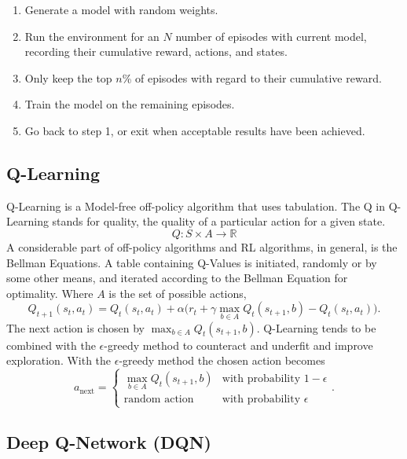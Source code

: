 \begin{enumerate}[label=Step \arabic*:, itemsep=0mm]
	\item Generate a model with random weights.
	\item Run the environment for an $N$ number of episodes with current model, recording their cumulative reward, actions, and states.
	\item Only keep the top $n$\% of episodes with regard to their cumulative reward.
	\item Train the model on the remaining episodes.
	\item Go back to step 1, or exit when acceptable results have been achieved.
\end{enumerate}

\subsection{Q-Learning}

Q-Learning is a Model-free off-policy algorithm that uses tabulation. The Q in Q-Learning stands for quality, the quality of a particular action for a given state. $$Q:S\times A\rightarrow \mathbb{R}$$ A considerable part of off-policy algorithms and RL algorithms, in general, is the Bellman Equations. A table containing Q-Values is initiated, randomly or by some other means, and iterated according to the Bellman Equation for optimality. Where $A$ is the set of possible actions, $$Q_{t+1}(s_t, a_t)=Q_t(s_t, a_t)+\alpha \big(r_t+\gamma\max_{b\in A} Q_t(s_{t+1},b)-Q_t(s_t,a_t)\big).$$ The next action is chosen by $\max_{b\in A} Q_t(s_{t+1},b)$. Q-Learning tends to be combined with the $\epsilon$-greedy method to counteract and underfit and improve exploration. With the $\epsilon$-greedy method the chosen action becomes $$a_{\text{next}}=\begin{cases}\max_{b\in A} Q_t(s_{t+1},b) & \text{with probability }1-\epsilon \\ \text{random action}  & \text{with probability }\epsilon\end{cases}.$$

\subsection{Deep Q-Network (DQN)}

